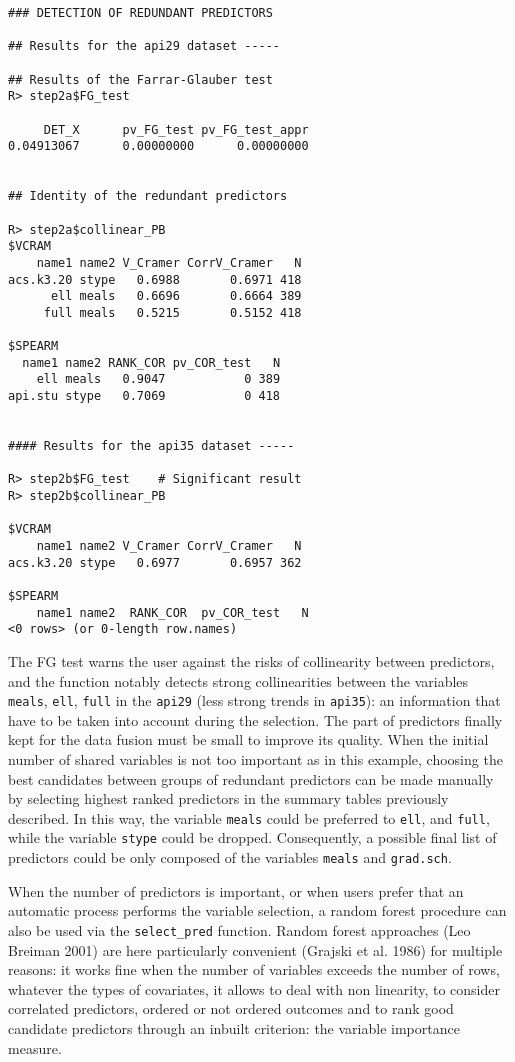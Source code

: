 \begin{verbatim}
### DETECTION OF REDUNDANT PREDICTORS

## Results for the api29 dataset -----

## Results of the Farrar-Glauber test 
R> step2a$FG_test       

     DET_X      pv_FG_test pv_FG_test_appr 
0.04913067      0.00000000      0.00000000 


## Identity of the redundant predictors

R> step2a$collinear_PB  
$VCRAM
    name1 name2 V_Cramer CorrV_Cramer   N
acs.k3.20 stype   0.6988       0.6971 418
      ell meals   0.6696       0.6664 389
     full meals   0.5215       0.5152 418

$SPEARM
  name1 name2 RANK_COR pv_COR_test   N
    ell meals   0.9047           0 389
api.stu stype   0.7069           0 418


#### Results for the api35 dataset -----

R> step2b$FG_test    # Significant result
R> step2b$collinear_PB

$VCRAM
    name1 name2 V_Cramer CorrV_Cramer   N
acs.k3.20 stype   0.6977       0.6957 362

$SPEARM
    name1 name2  RANK_COR  pv_COR_test   N          
<0 rows> (or 0-length row.names)
\end{verbatim}

The FG test warns the user against the risks of collinearity between predictors, and the function notably detects strong collinearities between the variables \texttt{meals}, \texttt{ell}, \texttt{full} in the \texttt{api29} (less strong trends in \texttt{api35}): an information that have to be taken into account during the selection. The part of predictors finally kept for the data fusion must be small to improve its quality. When the initial number of shared variables is not too important as in this example, choosing the best candidates between groups of redundant predictors can be made manually by selecting highest ranked predictors in the summary tables previously described. In this way, the variable \texttt{meals} could be preferred to \texttt{ell}, and \texttt{full}, while the variable \texttt{stype} could be dropped. Consequently, a possible final list of predictors could be only composed of the variables \texttt{meals} and \texttt{grad.sch}.

When the number of predictors is important, or when users prefer that an automatic process performs the
variable selection, a random forest procedure can also be used via the \texttt{select\_pred} function. Random forest approaches (Leo Breiman 2001) are here particularly convenient (Grajski et al. 1986) for multiple reasons: it works fine when the number of variables exceeds the number of rows, whatever the types of covariates, it allows to deal with non linearity, to consider correlated predictors, ordered or not ordered outcomes and to rank good candidate predictors through an inbuilt criterion: the variable importance measure.


